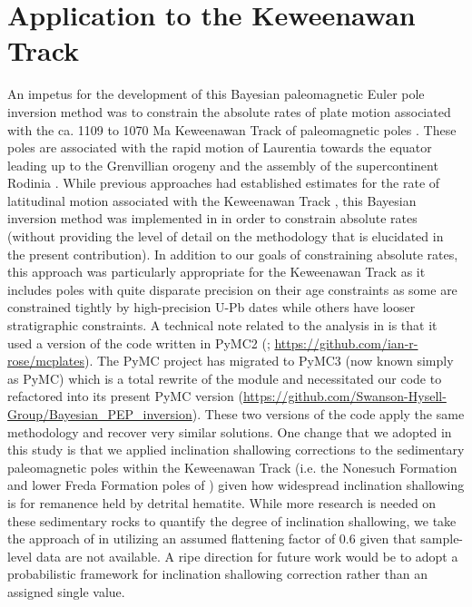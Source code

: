 \documentclass[11pt,letterpaper]{article}
\begin{document}
\section*{Application to the Keweenawan Track}
\label{sec:keweenawan}

An impetus for the development of this Bayesian paleomagnetic Euler pole inversion method was to constrain the absolute rates of plate motion associated with the ca. 1109 to 1070 Ma Keweenawan Track of paleomagnetic poles \citep{Halls1981a, Swanson-Hysell2009a, Swanson-Hysell2019a}. These poles are associated with the rapid motion of Laurentia towards the equator leading up to the Grenvillian orogeny and the assembly of the supercontinent Rodinia \citep{Swanson-Hysell2021a}. While previous approaches had established estimates for the rate of latitudinal motion associated with the Keweenawan Track \citep{Davis1997a, Swanson-Hysell2014b}, this Bayesian inversion method was implemented in \cite{Swanson-Hysell2019a} in order to constrain absolute rates (without providing the level of detail on the methodology that is elucidated in the present contribution). In addition to our goals of constraining absolute rates, this approach was particularly appropriate for the Keweenawan Track as it includes poles with quite disparate precision on their age constraints as some are constrained tightly by high-precision U-Pb dates \citep[e.g.][]{Fairchild2017a} while others have looser stratigraphic constraints. A technical note related to the analysis in \cite{Swanson-Hysell2019a} is that it used a version of the code written in PyMC2 (\citealp{Patil2010a}; \url{https://github.com/ian-r-rose/mcplates}). The PyMC project has migrated to PyMC3 (now known simply as PyMC) which is a total rewrite of the module \citep{Salvatier2016a} and necessitated our code to refactored into its present PyMC version (\url{https://github.com/Swanson-Hysell-Group/Bayesian_PEP_inversion}). These two versions of the code apply the same methodology and recover very similar solutions. One change that we adopted in this study is that we applied inclination shallowing corrections to the sedimentary paleomagnetic poles within the Keweenawan Track (i.e. the Nonesuch Formation and lower Freda Formation poles of \cite{Henry1977a}) given how widespread inclination shallowing is for remanence held by detrital hematite. While more research is needed on these sedimentary rocks to quantify the degree of inclination shallowing, we take the approach of \cite{Domeier2012a} in utilizing an assumed flattening factor of 0.6 given that sample-level data are not available. A ripe direction for future work would be to adopt a probabilistic framework for inclination shallowing correction rather than an assigned single value.
\end{document}
